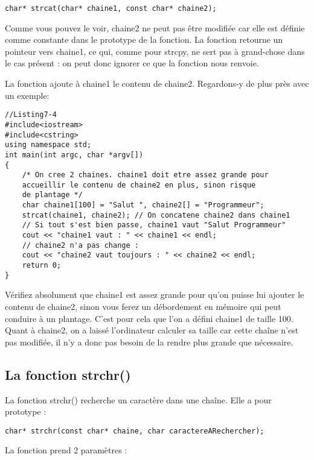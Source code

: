 \documentclass[a4paper, oneside,11pt]{book}
\begin{document}
\begin{lstlisting}
char* strcat(char* chaine1, const char* chaine2);
\end{lstlisting}


Comme vous pouvez le voir, chaine2 ne peut pas \^etre modifi\'ee car elle est d\'efinie comme constante dans le prototype de la fonction.
La fonction retourne un pointeur vers chaine1, ce qui, comme pour strcpy, ne sert pas \`a grand-chose dans le cas pr\'esent : on peut donc ignorer ce que la fonction nous renvoie.

La fonction ajoute \`a chaine1 le contenu de chaine2. Regardons-y de plus pr\`es avec un exemple:

\begin{lstlisting}
//Listing7-4
#include<iostream>
#include<cstring>
using namespace std;
int main(int argc, char *argv[])
{
    /* On cree 2 chaines. chaine1 doit etre assez grande pour 
    accueillir le contenu de chaine2 en plus, sinon risque 
    de plantage */
    char chaine1[100] = "Salut ", chaine2[] = "Programmeur";
    strcat(chaine1, chaine2); // On concatene chaine2 dans chaine1
    // Si tout s'est bien passe, chaine1 vaut "Salut Programmeur"
    cout << "chaine1 vaut : " << chaine1 << endl;
    // chaine2 n'a pas change :
    cout << "chaine2 vaut toujours : " << chaine2 << endl;
    return 0;
}
\end{lstlisting}


V\'erifiez absolument que chaine1 est assez grande pour qu'on puisse lui ajouter le contenu de chaine2, sinon vous ferez un d\'ebordement en m\'emoire qui peut conduire \`a un plantage.
C'est pour cela que l'on a d\'efini chaine1 de taille 100. Quant \`a chaine2, on a laiss\'e l'ordinateur calculer sa taille car cette cha\^ine n'est pas modifi\'ee, il n'y a donc pas besoin 
de la rendre plus grande que n\'ecessaire.



\subsection{La fonction strchr()}

La fonction strchr() recherche un caract\`ere dans une cha\^ine. Elle a pour prototype :


\begin{lstlisting}
char* strchr(const char* chaine, char caractereARechercher);
\end{lstlisting}

La fonction prend 2 param\`etres :
\end{document}
